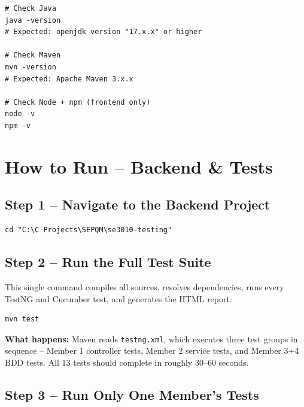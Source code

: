 \documentclass[12pt,a4paper]{article}
\begin{document}
\begin{lstlisting}[style=shellStyle, numbers=none, caption={Verify all tools are installed}]
# Check Java
java -version
# Expected: openjdk version "17.x.x" or higher

# Check Maven
mvn -version
# Expected: Apache Maven 3.x.x

# Check Node + npm (frontend only)
node -v
npm -v
\end{lstlisting}

\section{How to Run -- Backend \& Tests}

\subsection{Step 1 -- Navigate to the Backend Project}

\begin{lstlisting}[style=shellStyle, numbers=none]
cd "C:\C Projects\SEPQM\se3010-testing"
\end{lstlisting}

\subsection{Step 2 -- Run the Full Test Suite}

This single command compiles all sources, resolves dependencies, runs every
TestNG and Cucumber test, and generates the HTML report:

\begin{lstlisting}[style=shellStyle, numbers=none, caption={Run all tests}]
mvn test
\end{lstlisting}

\begin{infoblock}
\textbf{What happens:} Maven reads \texttt{testng.xml}, which executes three test groups
in sequence -- Member 1 controller tests, Member 2 service tests, and Member 3+4 BDD tests.
All 13 tests should complete in roughly 30--60 seconds.
\end{infoblock}

\subsection{Step 3 -- Run Only One Member's Tests}
\end{document}
